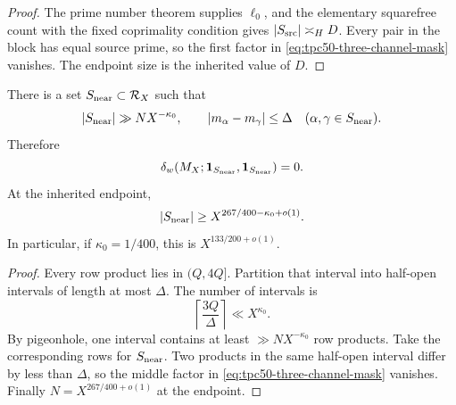 \begin{proof}
The prime number theorem supplies \(\ell_0\), and the elementary
squarefree count with the fixed coprimality condition gives
\(|S_{\rm src}|\asymp_H D\).  Every pair in the block has equal source
prime, so the first factor in \eqref{eq:tpc50-three-channel-mask}
vanishes.  The endpoint size is the inherited value of \(D\).
\end{proof}

\begin{proposition}
\label{prop:tpc50-near-block}
There is a set \(S_{\rm near}\subset\mathcal R_X\) such that
\begin{equation}
 |S_{\rm near}|
 \gg N X^{-\kappa_0},
 \qquad
 |m_\alpha-m_\gamma|\le\Delta
 \quad(\alpha,\gamma\in S_{\rm near}).
 \label{eq:tpc50-near-block-data}
\end{equation}
Therefore
\begin{equation}
 \delta_w(M_X;\mathbf 1_{S_{\rm near}},\mathbf 1_{S_{\rm near}})=0.
 \label{eq:tpc50-near-zero-survival}
\end{equation}
At the inherited endpoint,
\begin{equation}
 |S_{\rm near}|
 \ge X^{267/400-\kappa_0+o(1)}.
 \label{eq:tpc50-near-block-endpoint}
\end{equation}
In particular, if \(\kappa_0=1/400\), this is
\(X^{133/200+o(1)}\).
\end{proposition}

\begin{proof}
Every row product lies in \((Q,4Q]\).  Partition that interval into
half-open intervals of length at most \(\Delta\).  The number of
intervals is
\begin{equation}
 \left\lceil\frac{3Q}{\Delta}\right\rceil
 \ll X^{\kappa_0}.
 \label{eq:tpc50-near-bin-count}
\end{equation}
By pigeonhole, one interval contains at least
\(\gg NX^{-\kappa_0}\) row products.  Take the corresponding rows for
\(S_{\rm near}\).  Two products in the same half-open interval differ
by less than \(\Delta\), so the middle factor in
\eqref{eq:tpc50-three-channel-mask} vanishes.  Finally
\(N=X^{267/400+o(1)}\) at the endpoint.
\end{proof}

